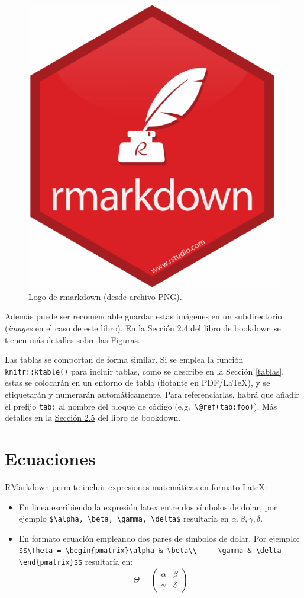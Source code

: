 \documentclass[
]{book}
\theoremstyle{definition}
\theoremstyle{definition}
\theoremstyle{definition}
\theoremstyle{definition}
\theoremstyle{remark}
\begin{document}
\begin{figure}

{\centering \includegraphics[width=0.3\linewidth]{images/rmarkdown} 

}

\caption{Logo de rmarkdown (desde archivo PNG).}\label{fig:rmarkdown}
\end{figure}

Además puede ser recomendable guardar estas imágenes en un subdirectorio (\emph{images} en el caso de este libro).
En la \href{https://bookdown.org/yihui/bookdown/figures.html}{Sección 2.4} del libro de bookdown se tienen más detalles sobre las Figuras.

Las tablas se comportan de forma similar. Si se emplea la función \texttt{knitr::ktable()}
para incluir tablas, como se describe en la Sección \ref{tablas},
estas se colocarán en un entorno de tabla (flotante en
PDF/LaTeX), y se etiquetarán y numerarán automáticamente.
Para referenciarlas, habrá que añadir el prefijo \texttt{tab:} al nombre del bloque de código
(e.g.~\texttt{\textbackslash{}@ref(tab:foo)}).
Más detalles en la \href{https://bookdown.org/yihui/bookdown/tables.html}{Sección 2.5}
del libro de bookdown.

\hypertarget{ecuaciones}{%
\section{Ecuaciones}\label{ecuaciones}}

RMarkdown permite incluir expresiones matemáticas en formato LateX:

\begin{itemize}
\item
  En linea escribiendo la expresión latex entre dos símbolos de dolar,
  por ejemplo \texttt{\$\textbackslash{}alpha,\ \textbackslash{}beta,\ \textbackslash{}gamma,\ \textbackslash{}delta\$}
  resultaría en \(\alpha, \beta, \gamma, \delta\).
\item
  En formato ecuación empleando dos pares de símbolos de dolar. Por ejemplo:
  \texttt{\$\$\textbackslash{}Theta\ =\ \textbackslash{}begin\{pmatrix\}\textbackslash{}alpha\ \&\ \textbackslash{}beta\textbackslash{}\textbackslash{}\ \ \ \ \ \textbackslash{}gamma\ \&\ \textbackslash{}delta\ \ \ \ \ \textbackslash{}end\{pmatrix\}\$\$}
  resultaría en:
  \[\Theta = \begin{pmatrix}\alpha & \beta\\
  \gamma & \delta
  \end{pmatrix}\]
\end{itemize}
\end{document}
